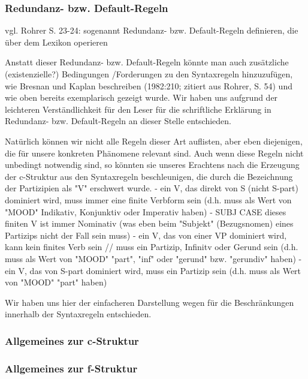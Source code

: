 \documentclass[12pt,a4paper]{article}
\begin{document}
\subsubsection{Redundanz- bzw. Default-Regeln}
vgl. Rohrer S. 23-24:
sogenannt Redundanz- bzw. Default-Regeln definieren, die über dem Lexikon operieren

Anstatt dieser Redundanz- bzw. Default-Regeln könnte man auch zusätzliche (existenzielle?) Bedingungen /Forderungen zu den Syntaxregeln hinzuzufügen, wie Bresnan und Kaplan beschreiben (1982:210; zitiert aus Rohrer, S. 54) und wie oben bereits exemplarisch gezeigt wurde. Wir haben uns aufgrund der leichteren Verständlichkeit für den Leser für die schriftliche Erklärung in Redundanz- bzw. Default-Regeln an dieser Stelle entschieden.

Natürlich können wir nicht alle Regeln dieser Art auflisten, aber eben diejenigen, die für unsere konkreten
Phänomene relevant sind.
Auch wenn diese Regeln nicht unbedingt notwendig sind, so könnten sie
unseres Erachtens nach die Erzeugung der c-Struktur aus den Syntaxregeln
beschleunigen, die durch die Bezeichnung der Partizipien als "V" erschwert
wurde.
- ein V, das direkt von S (nicht S-part) dominiert wird, muss immer eine
finite Verbform sein (d.h. muss als Wert von "MOOD" Indikativ, Konjunktiv oder
 Imperativ haben)
- SUBJ CASE dieses finiten V ist immer Nominativ (was eben beim "Subjekt"
(Bezugsnomen) eines Partizips nicht der Fall sein muss)
- ein V, das von einer VP dominiert wird, kann kein finites Verb sein //
muss ein Partizip, Infinitv oder Gerund sein (d.h. muss als Wert von "MOOD"
"part", "inf" oder "gerund" bzw. "gerundiv" haben)
- ein V, das von S-part dominiert wird, muss ein Partizip sein (d.h. muss
als Wert von "MOOD" "part" haben)

Wir haben uns hier der einfacheren Darstellung wegen für die Beschränkungen innerhalb der Syntaxregeln entschieden.

\subsubsection{Allgemeines zur c-Struktur}
\subsubsection{Allgemeines zur f-Struktur}
\end{document}
